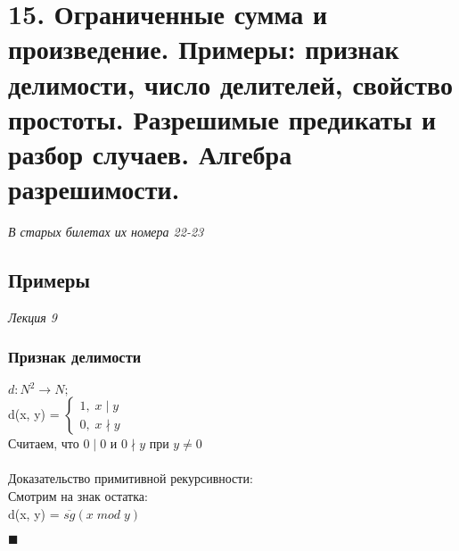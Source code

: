 \section{15. Ограниченные сумма и произведение. Примеры: признак делимости, число делителей,
свойство простоты. Разрешимые предикаты и разбор случаев. Алгебра разрешимости.}

\emph{В старых билетах их номера 22-23}\\

\subsection{Примеры}
\emph{Лекция 9}
\subsubsection{Признак делимости} 
    $d: N^{2} \rightarrow N;$ \\
    d(x, y) =
    $\left\{ 
        \begin{aligned} 
        1,\; x \mid y \\
        0,\; x \nmid y
    \end{aligned}
    \right. $
    \\Считаем, что $0 \mid 0$ и $0 \nmid y$ при $y \neq 0$\\ 
    \\Доказательство примитивной рекурсивности:\\
    Смотрим на знак остатка:\\
    d(x, y) = $\overline{sg}(x\; mod\; y)$
    \begin{flushright}
        $\blacksquare$
    \end{flushright}
    
